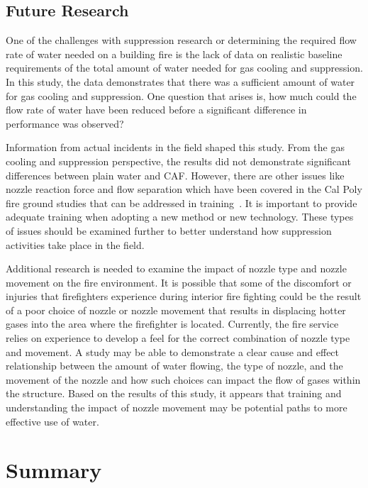 \documentclass[12pt,oneside]{book}
\begin{document}
\section{Future Research}

One of the challenges with suppression research or determining the required flow rate of water needed on a building fire is the lack of data on realistic baseline requirements of the total amount of water needed for gas cooling and suppression. In this study, the data demonstrates that there was a sufficient amount of water for gas cooling and suppression. One question that arises is, how much could the flow rate of water have been reduced before a significant difference in performance was observed? 

Information from actual incidents in the field shaped this study. From the gas cooling and suppression perspective, the results did not demonstrate significant differences between plain water and CAF. However, there are other issues like nozzle reaction force and flow separation which have been covered in the Cal Poly fire ground studies that can be addressed in training~\cite{Carracino:2013,Dicus:2013,LaPolla:2012}.  It is important to provide adequate training when adopting a new method or new technology. These types of issues should be examined further to better understand how suppression activities take place in the field.

Additional research is needed to examine the impact of nozzle type and nozzle movement on the fire environment. It is possible that some of the discomfort or injuries that firefighters experience during interior fire fighting could be the result of a poor choice of nozzle or nozzle movement that results in displacing hotter gases into the area where the firefighter is located. Currently, the fire service relies on experience to develop a feel for the correct combination of nozzle type and movement. A study may be able to demonstrate a clear cause and effect relationship between the amount of water flowing, the type of nozzle, and the movement of the nozzle and how such choices can impact the flow of gases within the structure. Based on the results of this study, it appears that training and understanding the impact of nozzle movement may be potential paths to more effective use of water. 

\chapter{Summary}
\label{chap:Summary}
\end{document}
